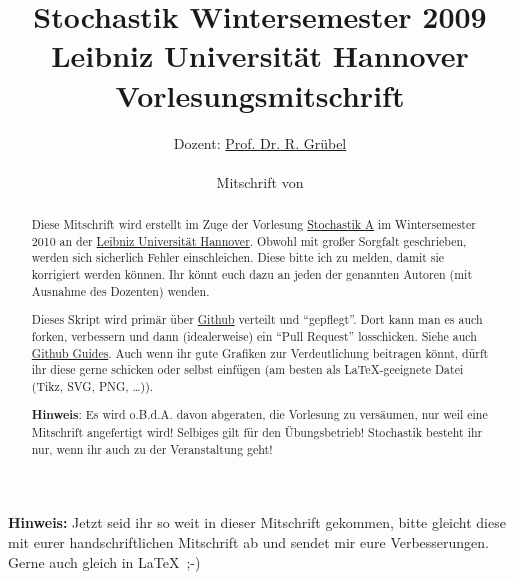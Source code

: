 \documentclass[a4paper,twoside,12pt]{article}
\title{Stochastik Wintersemester 2009\\Leibniz Universit\"at Hannover\\Vorlesungsmitschrift}
\author{Dozent: \href{mailto:rgrubel@stochastik.uni-hannover.de}{Prof. Dr. R. Gr\"ubel}\\ \vspace{1em} \\
Mitschrift von\\
}
\begin{document}
\pagestyle{empty}
\maketitle
\begin{abstract}
    Diese Mitschrift wird erstellt im Zuge der Vorlesung \href{http://www.stochastik.uni-hannover.de/ws2010.html}{Stochastik A} im Wintersemester 2010 an der \href{http://www.uni-hannover.de}{Leibniz Universit\"at Hannover}. Obwohl mit gro\ss er Sorgfalt geschrieben, werden sich sicherlich Fehler einschleichen. Diese bitte ich zu melden, damit sie korrigiert werden k\"onnen. Ihr k\"onnt euch dazu an jeden der genannten Autoren (mit Ausnahme des Dozenten) wenden.

    Dieses Skript wird prim\"ar \"uber \href{http://github.com/rbecher/luh-vorlesungen-inf-ws10-stoch}{Github} verteilt und "`gepflegt"'. Dort kann man es auch forken, verbessern und dann (idealerweise) ein "`Pull Request"' losschicken. Siehe auch  \href{http://github.com/guides}{Github Guides}. Auch wenn ihr gute Grafiken zur Verdeutlichung beitragen k\"onnt, d\"urft ihr diese gerne schicken oder selbst einf\"ugen (am besten als \LaTeX -geeignete Datei (Tikz, SVG, PNG, \dots)).

    \textbf{Hinweis}: Es wird o.B.d.A. davon abgeraten, die Vorlesung zu vers\"aumen, nur weil eine Mitschrift angefertigt wird! Selbiges gilt f\"ur den \"Ubungsbetrieb! Stochastik besteht ihr nur, wenn ihr auch zu der Veranstaltung geht!
\end{abstract}

\newpage %

\tableofcontents


\newpage

\pagestyle{fancy}
\addtolength{\headheight}{\baselineskip}
\renewcommand{\sectionmark}[1]{\markboth{#1}{}}
\renewcommand{\subsectionmark}[1]{\markright{#1}}
\fancyhead[LO,RE]{\leftmark\\\rightmark}





\textbf{Hinweis:} Jetzt seid ihr so weit in dieser Mitschrift gekommen, bitte gleicht diese mit eurer handschriftlichen Mitschrift ab und sendet mir eure Verbesserungen. Gerne auch gleich in \LaTeX\ ;-)





%

%
\end{document}

